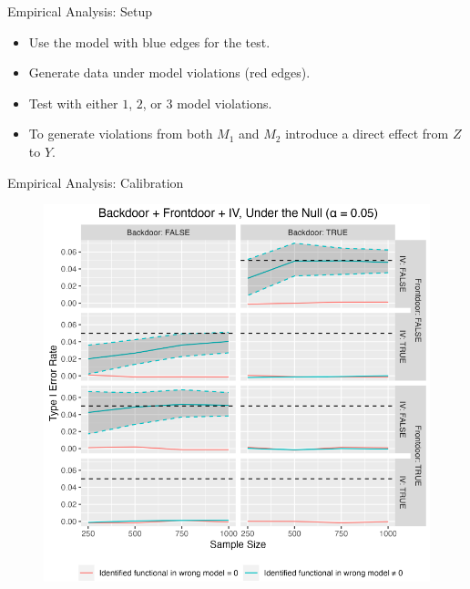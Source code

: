 \documentclass{beamer}
\begin{document}
\begin{frame}{Empirical Analysis: Setup}
	\begin{itemize}
		\item Use the model with blue edges for the test.
		\item Generate data under model violations (red edges).
		\item Test with either $1$, $2$, or $3$ model violations.
		\item To generate violations from both $M_1$ and $M_2$ introduce a direct effect from $ Z $ to $ Y $.
	\end{itemize}
\end{frame}

\begin{frame}{Empirical Analysis: Calibration}
	\begin{figure}
		\center
		\includegraphics[scale=0.3]{calibration.png}
	\end{figure}
\end{frame}
\end{document}
